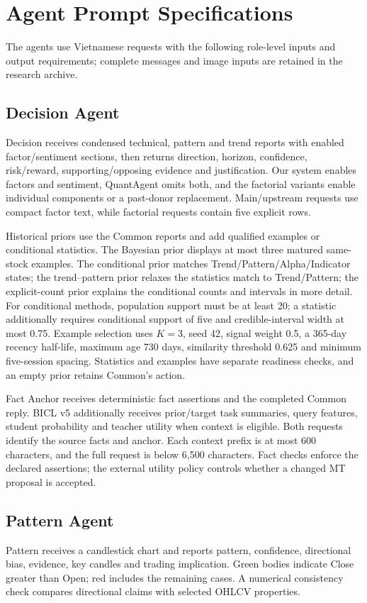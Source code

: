 \appendix
\section{Agent Prompt Specifications}
\label{app:prompts}
The agents use Vietnamese requests with the following role-level inputs and output requirements; complete messages and image inputs are retained in the research archive.

\subsection{Decision Agent}
\label{app:prompt_decision}
Decision receives condensed technical, pattern and trend reports with enabled factor/sentiment sections, then returns direction, horizon, confidence, risk/reward, supporting/opposing evidence and justification. Our system enables factors and sentiment, QuantAgent omits both, and the factorial variants enable individual components or a past-donor replacement. Main/upstream requests use compact factor text, while factorial requests contain five explicit rows.

Historical priors use the Common reports and add qualified examples or conditional statistics. The Bayesian prior displays at most three matured same-stock examples. The conditional prior matches Trend/Pattern/Alpha/Indicator states; the trend--pattern prior relaxes the statistics match to Trend/Pattern; the explicit-count prior explains the conditional counts and intervals in more detail. For conditional methods, population support must be at least 20; a statistic additionally requires conditional support of five and credible-interval width at most 0.75. Example selection uses $K=3$, seed 42, signal weight 0.5, a 365-day recency half-life, maximum age 730 days, similarity threshold 0.625 and minimum five-session spacing. Statistics and examples have separate readiness checks, and an empty prior retains Common's action.

Fact Anchor receives deterministic fact assertions and the completed Common reply. BICL v5 additionally receives prior/target task summaries, query features, student probability and teacher utility when context is eligible. Both requests identify the source facts and anchor. Each context prefix is at most 600 characters, and the full request is below 6,500 characters. Fact checks enforce the declared assertions; the external utility policy controls whether a changed MT proposal is accepted.

\subsection{Pattern Agent}
\label{app:prompt_pattern}
Pattern receives a candlestick chart and reports pattern, confidence, directional bias, evidence, key candles and trading implication. Green bodies indicate Close greater than Open; red includes the remaining cases. A numerical consistency check compares directional claims with selected OHLCV properties.

